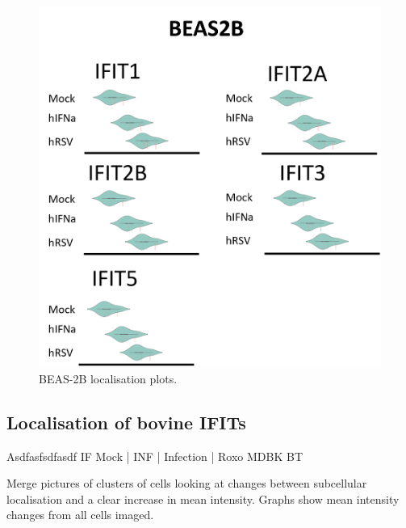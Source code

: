 \begin{figure}
    \centering
    \includegraphics[width=1\linewidth]{06. Chapter 1/Figs/03. Localisation/04. beas2b plots.png}
    \caption[BEAS-2B localisation plots.]{BEAS-2B localisation plots.}
    \label{BEAS-2B localisation plots.}
\end{figure}



\subsection{Localisation of bovine IFITs}
Asdfasfsdfasdf \newline
IF Mock | INF | Infection | Roxo \newline
MDBK BT

Merge pictures of clusters of cells looking at changes between subcellular localisation and a clear increase in mean intensity. Graphs show mean intensity changes from all cells imaged.

